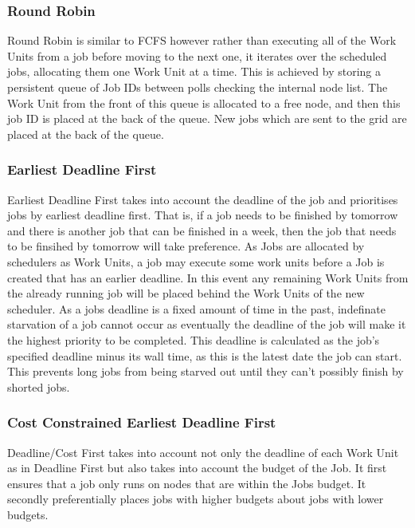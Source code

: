 \subsubsection{Round Robin}
Round Robin is similar to FCFS however rather than executing all of the Work Units from a job before moving to the next one, it iterates over the scheduled jobs, allocating them one Work Unit at a time. This is achieved by storing a persistent queue of Job IDs between polls checking the internal node list. The Work Unit from the front of this queue is allocated to a free node, and then this job ID is placed at the back of the queue. New jobs which are sent to the grid are placed at the back of the queue.

\subsubsection{Earliest Deadline First}
Earliest Deadline First takes into account the deadline of the job and prioritises jobs by earliest deadline first. That is, if a job needs to be finished by tomorrow and there is another job that can be finished in a week, then the job that needs to be finsihed by tomorrow will take preference. As Jobs are allocated by schedulers as Work Units, a job may execute some work units before a Job is created that has an earlier deadline. In this event any remaining Work Units from the already running job will be placed behind the Work Units of the new scheduler. As a jobs deadline is a fixed amount of time in the past, indefinate starvation of a job cannot occur as eventually the deadline of the job will make it the highest priority to be completed. This deadline is calculated as the job's specified deadline minus its wall time, as this is the latest date the job can start. This prevents long jobs from being starved out until they can't possibly finish by shorted jobs.

\subsubsection{Cost Constrained Earliest Deadline First}
Deadline/Cost First takes into account not only the deadline of each Work Unit as in Deadline First but also takes into account the budget of the Job. It first ensures that a job only runs on nodes that are within the Jobs budget. It secondly preferentially places jobs with higher budgets about jobs with lower budgets.

